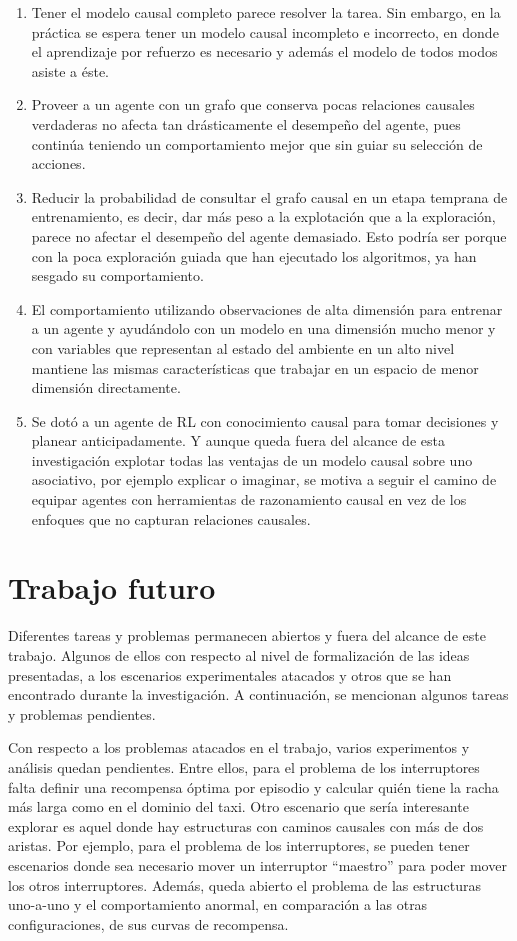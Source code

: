 \begin{enumerate}
    \item Tener el modelo causal completo parece resolver la tarea. Sin embargo, en la práctica se espera tener un modelo causal incompleto e incorrecto, en donde el aprendizaje por refuerzo es necesario y además el modelo de todos modos asiste a éste.
    \item Proveer a un agente con un grafo que conserva pocas relaciones
    causales verdaderas no afecta tan drásticamente el desempeño del agente, pues 
    continúa teniendo un comportamiento mejor que sin guiar su selección de acciones.
    \item Reducir la probabilidad de consultar el grafo causal en un etapa 
    temprana de entrenamiento, es decir, dar más peso a la explotación que a la exploración, parece no afectar el desempeño del agente demasiado. Esto podría
    ser porque con la poca exploración guiada que han ejecutado los algoritmos,
    ya han sesgado su comportamiento.
    \item El comportamiento utilizando observaciones de alta dimensión para entrenar a un agente y ayudándolo con un modelo en una dimensión mucho menor y con variables que representan al estado del ambiente en un alto nivel mantiene las mismas características que trabajar en un espacio de menor dimensión directamente.
    \item Se dotó a un agente de RL con conocimiento causal para tomar decisiones y planear anticipadamente. Y aunque queda fuera del alcance de esta investigación explotar todas las ventajas de un modelo causal sobre uno asociativo, por ejemplo explicar o imaginar, se motiva a seguir el camino de equipar agentes con herramientas de razonamiento causal en vez de los enfoques que no capturan relaciones causales.
\end{enumerate}

\section{Trabajo futuro}

Diferentes tareas y problemas permanecen abiertos y fuera del alcance de este trabajo. Algunos de ellos con respecto al nivel de formalización de las ideas presentadas, a los escenarios experimentales atacados  y otros que se han encontrado durante la investigación. A continuación, se 
mencionan algunos tareas y problemas pendientes.

Con respecto a los problemas atacados en el trabajo,
varios experimentos y análisis quedan pendientes. Entre ellos, 
para el problema de los interruptores falta 
definir una recompensa óptima por episodio y 
calcular quién tiene la racha más larga como en el dominio del taxi.  Otro escenario que sería interesante
explorar es aquel donde hay estructuras con caminos causales con más de dos aristas. Por ejemplo, para el problema de los interruptores, se pueden
tener escenarios donde sea necesario mover un interruptor ``maestro'' para
poder mover los otros interruptores. Además, queda abierto el problema
de las estructuras uno-a-uno y el comportamiento anormal, en comparación
a las otras configuraciones, de sus curvas de recompensa.

